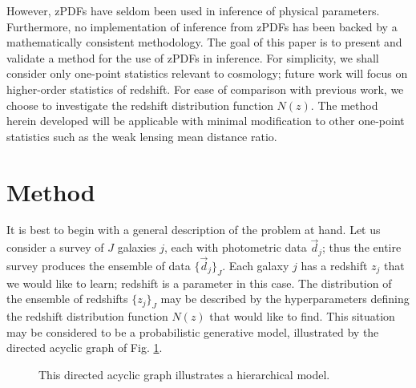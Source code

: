 \documentclass[preprint]{aastex}
\begin{document}
However, zPDFs have seldom been used in inference of physical parameters.  Furthermore, no implementation of inference from zPDFs has been backed by a mathematically consistent methodology.  The goal of this paper is to present and validate a method for the use of zPDFs in inference.  For simplicity, we shall consider only one-point statistics relevant to cosmology; future work will focus on higher-order statistics of redshift.  For ease of comparison with previous work, we choose to investigate the redshift distribution function $N(z)$.  The method herein developed will be applicable with minimal modification to other one-point statistics such as the weak lensing mean distance ratio.

\section{Method}
\label{sec:meth}

It is best to begin with a general description of the problem at hand.  Let us consider a survey of $J$ galaxies $j$, each with photometric data $\vec{d}_{j}$; thus the entire survey produces the ensemble of data $\{\vec{d}_{j}\}_{J}$.  Each galaxy $j$ has a redshift $z_{j}$ that we would like to learn; redshift is a parameter in this case.  The distribution of the ensemble of redshifts $\{z_{j}\}_{J}$ may be described by the hyperparameters defining the redshift distribution function $N(z)$ that would like to find.  This situation may be considered to be a probabilistic generative model, illustrated by the directed acyclic graph of Fig. \ref{fig:flow}.  

\begin{figure}
\vspace{0.5cm}
\begin{center}
\caption{This directed acyclic graph illustrates a hierarchical model.}
\label{fig:flow}
\end{center}
\end{figure}
\end{document}
